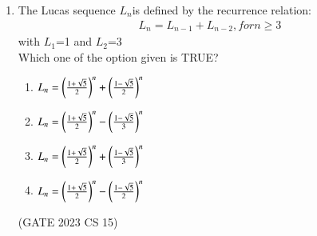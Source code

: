 \begin{enumerate}[label=\thechapter.\arabic*,ref=\thechapter.\theenumi]
 \item The Lucas sequence $L_{n}$is defined by the recurrence relation:\\
\begin{align*}
    L_{n}=L_{n-1}+L_{n-2}, for n\geq3
\end{align*}
with $L_{1}$=1 and $L_{2}$=3\\
Which one of the option given is TRUE?\\
\begin{enumerate}
    \item $L_{n}=\left(\frac{1+\sqrt{5}}{2}\right)^n+\left(\frac{1-\sqrt{5}}{2}\right)^n$
    \item $L_{n}=\left(\frac{1+\sqrt{5}}{2}\right)^n-\left(\frac{1-\sqrt{5}}{3}\right)^n$
    \item $L_{n}=\left(\frac{1+\sqrt{5}}{2}\right)^n+\left(\frac{1-\sqrt{5}}{3}\right)^n$
    \item $L_{n}=\left(\frac{1+\sqrt{5}}{2}\right)^n-\left(\frac{1-\sqrt{5}}{2}\right)^n$
\end{enumerate}
\hfill{(GATE 2023 CS 15)}\\
\solution
{}
\pagebreak
\end{enumerate}
